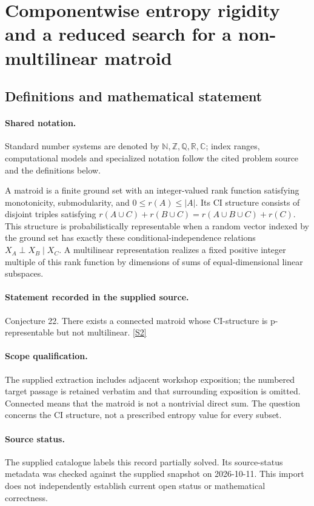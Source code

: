 \documentclass[11pt]{article}
\newcommand{\sref}[2]{\hyperlink{source:#1:#2}{[S#2]}}
\begin{document}
\section{Componentwise entropy rigidity and a reduced search for a non-multilinear matroid}\label{statement}

\subsection{Definitions and mathematical statement}

\paragraph{Shared notation.}Standard number systems are denoted by $\mathbb N,\mathbb Z,\mathbb Q,\mathbb R,\mathbb C$; index ranges, computational models and specialized notation follow the cited problem source and the definitions below.


A matroid is a finite ground set with an integer-valued rank function satisfying monotonicity, submodularity, and $0\le r(A)\le |A|$. Its CI structure consists of disjoint triples satisfying $r(A\cup C)+r(B\cup C)=r(A\cup B\cup C)+r(C)$. This structure is probabilistically representable when a random vector indexed by the ground set has exactly these conditional-independence relations $X_A\perp X_B\mid X_C$. A multilinear representation realizes a fixed positive integer multiple of this rank function by dimensions of sums of equal-dimensional linear subspaces.
\paragraph{Statement recorded in the supplied source.}
Conjecture 22. There exists a connected matroid whose CI-structure is p-representable but not multilinear. \sref{statement}{2}
\paragraph{Scope qualification.}
The supplied extraction includes adjacent workshop exposition; the numbered target passage is retained verbatim and that surrounding exposition is omitted. Connected means that the matroid is not a nontrivial direct sum. The question concerns the CI structure, not a prescribed entropy value for every subset.
\paragraph{Source status.}
The supplied catalogue labels this record partially solved. Its source-status metadata was checked against the supplied snapshot on 2026-10-11. This import does not independently establish current open status or mathematical correctness.
\end{document}
